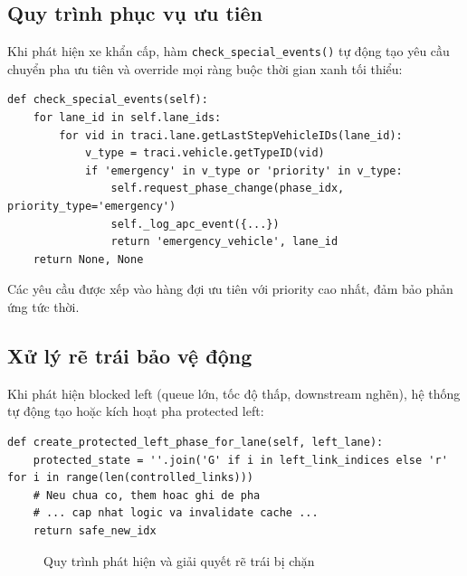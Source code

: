 \subsection{Quy trình phục vụ ưu tiên}

Khi phát hiện xe khẩn cấp, hàm \texttt{check\_special\_events()} tự động tạo yêu cầu chuyển pha ưu tiên và override mọi ràng buộc thời gian xanh tối thiểu:

\begin{lstlisting}[style=py,caption={Phát hiện và phục vụ xe ưu tiên}]
def check_special_events(self):
    for lane_id in self.lane_ids:
        for vid in traci.lane.getLastStepVehicleIDs(lane_id):
            v_type = traci.vehicle.getTypeID(vid)
            if 'emergency' in v_type or 'priority' in v_type:
                self.request_phase_change(phase_idx, priority_type='emergency')
                self._log_apc_event({...})
                return 'emergency_vehicle', lane_id
    return None, None
\end{lstlisting}

Các yêu cầu được xếp vào hàng đợi ưu tiên với priority cao nhất, đảm bảo phản ứng tức thời.

\subsection{Xử lý rẽ trái bảo vệ động}

Khi phát hiện blocked left (queue lớn, tốc độ thấp, downstream nghẽn), hệ thống tự động tạo hoặc kích hoạt pha protected left:

\begin{lstlisting}[style=py,caption={Tạo pha protected left động}]
def create_protected_left_phase_for_lane(self, left_lane):
    protected_state = ''.join('G' if i in left_link_indices else 'r' for i in range(len(controlled_links)))
    # Neu chua co, them hoac ghi de pha
    # ... cap nhat logic va invalidate cache ...
    return safe_new_idx
\end{lstlisting}

\begin{figure}[H]
    \centering
    \caption{Quy trình phát hiện và giải quyết rẽ trái bị chặn}
    \label{fig:left_turn_flow}
\end{figure}


